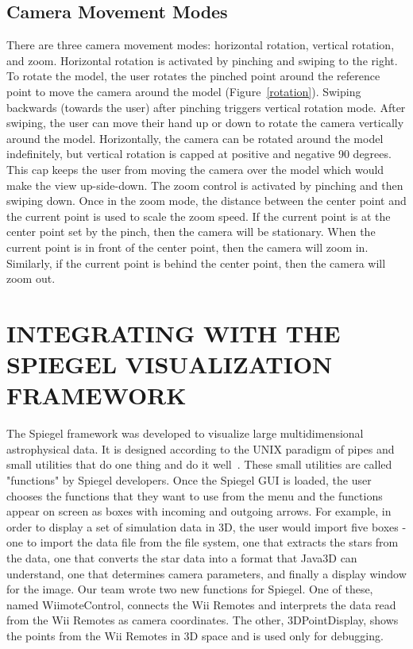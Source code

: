 \documentclass[a4paper,twoside]{article}
\begin{document}
\subsection{Camera Movement Modes}
  There are three camera movement modes: horizontal rotation, vertical rotation, and zoom. Horizontal rotation is activated by pinching and swiping to the right. To rotate the model, the user rotates the pinched point around the reference point to move the camera around the model (Figure~\ref{rotation}). Swiping backwards (towards the user) after pinching triggers vertical rotation mode. After swiping, the user can move their hand up or down to rotate the camera vertically around the model. Horizontally, the camera can be rotated around the model indefinitely, but vertical rotation is capped at positive and negative 90 degrees. This cap keeps the user from moving the camera over the model which would make the view up-side-down. The zoom control is activated by pinching and then swiping down. Once in the zoom mode, the distance between the center point and the current point is used to scale the zoom speed. If the current point is at the center point set by the pinch, then the camera will be stationary. When the current point is in front of the center point, then the camera will zoom in. Similarly, if the current point is behind the center point, then the camera will zoom out.

 
\section{\uppercase{Integrating with the Spiegel Visualization Framework}}
The Spiegel framework was developed to visualize large multidimensional astrophysical data. It is designed according to the UNIX paradigm of pipes and small utilities that do one thing and do it well~\cite{Bischof06}. These small utilities are called "functions" by Spiegel developers. Once the Spiegel GUI is loaded, the user chooses the functions that they want to use from the menu and the functions appear on screen as boxes with incoming and outgoing arrows. For example, in order to display a set of simulation data in 3D, the user would import five boxes - one to import the data file from the file system, one that extracts the stars from the data, one that converts the star data into a format that Java3D can understand, one that determines camera parameters, and finally a display window for the image. Our team wrote two new functions for Spiegel. One of these, named WiimoteControl, connects the Wii Remotes and interprets the data read from the Wii Remotes as camera coordinates. The other, 3DPointDisplay, shows the points from the Wii Remotes in 3D space and is used only for debugging.
\end{document}
